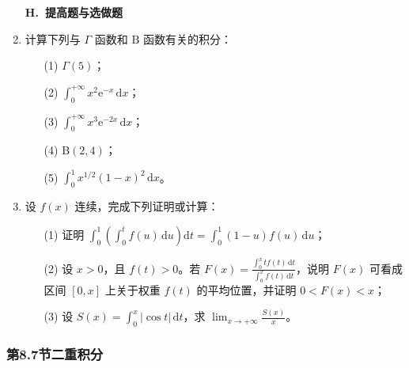 \documentclass[fontset=fandol]{ctexart}
\newcommand{\dd}{\mathrm{d}}
\newcommand{\ee}{\mathrm{e}}
\begin{document}
\begin{enumerate}
\item[]\textbf{H.\ 提高题与选做题}
\setcounter{enumi}{0}
\item 计算下列与 $\Gamma$ 函数和 $\mathrm B$ 函数有关的积分：
\begin{enumerate}
\item[(1)] $\displaystyle \Gamma(5)$；
\item[(2)] $\displaystyle \int_0^{+\infty}x^2\ee^{-x}\,\dd x$；
\item[(3)] $\displaystyle \int_0^{+\infty}x^3\ee^{-2x}\,\dd x$；
\item[(4)] $\displaystyle \mathrm B(2,4)$；
\item[(5)] $\displaystyle \int_0^1x^{1/2}(1-x)^2\,\dd x$。
\end{enumerate}

\item 设 $f(x)$ 连续，完成下列证明或计算：
\begin{enumerate}
\item[(1)] 证明 $\displaystyle \int_0^1\left(\int_0^t f(u)\,\dd u\right)\dd t=\int_0^1(1-u)f(u)\,\dd u$；
\item[(2)] 设 $x>0$，且 $f(t)>0$。若 $\displaystyle F(x)=\frac{\int_0^x tf(t)\,\dd t}{\int_0^x f(t)\,\dd t}$，说明 $F(x)$ 可看成区间 $[0,x]$ 上关于权重 $f(t)$ 的平均位置，并证明 $0<F(x)<x$；
\item[(3)] 设 $\displaystyle S(x)=\int_0^x|\cos t|\,\dd t$，求 $\displaystyle \lim_{x\to+\infty}\frac{S(x)}x$。
\end{enumerate}
\end{enumerate}

\subsubsection*{第8.7节\quad 二重积分}
\end{document}

